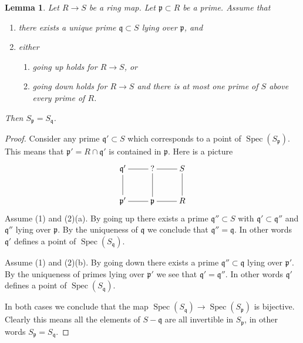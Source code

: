 \documentclass[10pt,a4paper]{amsart}
\theoremstyle{plain}
\newtheorem{lemma}[subsection]{Lemma}
\theoremstyle{definition}
\theoremstyle{remark}
\numberwithin{equation}{subsection}
\def\Spec{\mathop{\mathrm{Spec}}}
\begin{document}
\begin{lemma}
\label{lemma-unique-prime-over-localize-below}
Let $R \to S$ be a ring map.
Let $\mathfrak p \subset R$ be a prime.
Assume that
\begin{enumerate}
\item there exists a unique prime $\mathfrak q \subset S$ lying over
$\mathfrak p$, and
\item either
\begin{enumerate}
\item going up holds for $R \to S$, or
\item going down holds for $R \to S$ and there is at most one prime
of $S$ above every prime of $R$.
\end{enumerate}
\end{enumerate}
Then $S_{\mathfrak p} = S_{\mathfrak q}$.
\end{lemma}

\begin{proof}
Consider any prime $\mathfrak q' \subset S$ which corresponds to
a point of $\Spec(S_{\mathfrak p})$. This means that
$\mathfrak p' = R \cap \mathfrak q'$ is contained in $\mathfrak p$.
Here is a picture
$$
\xymatrix{
\mathfrak q' \ar@{-}[d] \ar@{-}[r] & ? \ar@{-}[r] \ar@{-}[d] & S \ar@{-}[d] \\
\mathfrak p' \ar@{-}[r] & \mathfrak p \ar@{-}[r] & R
}
$$
Assume (1) and (2)(a).
By going up there exists a prime $\mathfrak q'' \subset S$
with $\mathfrak q' \subset \mathfrak q''$ and $\mathfrak q''$
lying over $\mathfrak p$. By the uniqueness of $\mathfrak q$ we
conclude that $\mathfrak q'' = \mathfrak q$. In other words
$\mathfrak q'$ defines a point of $\Spec(S_{\mathfrak q})$.

\medskip\noindent
Assume (1) and (2)(b).
By going down there exists a prime $\mathfrak q'' \subset \mathfrak q$
lying over $\mathfrak p'$. By the uniqueness of primes lying over
$\mathfrak p'$ we see that $\mathfrak q' = \mathfrak q''$.  In other words
$\mathfrak q'$ defines a point of $\Spec(S_{\mathfrak q})$.

\medskip\noindent
In both cases we conclude that the map
$\Spec(S_{\mathfrak q}) \to \Spec(S_{\mathfrak p})$
is bijective. Clearly this means all the elements of $S - \mathfrak q$
are all invertible in $S_{\mathfrak p}$, in other words
$S_{\mathfrak p} = S_{\mathfrak q}$.
\end{proof}
\end{document}
